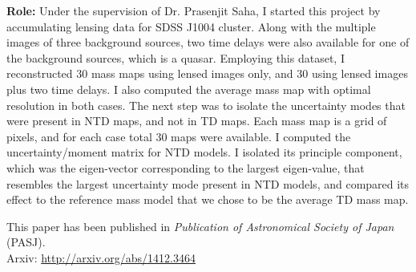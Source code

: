 {\bf Role:} Under the supervision of Dr. Prasenjit Saha, I started this project
by accumulating lensing data for SDSS J1004 cluster. Along with the multiple
images of three background sources, two time delays were also available for one 
of the background sources, which is a quasar. Employing this dataset, I reconstructed
30 mass maps using lensed images only, and 30 using lensed images plus two time
delays. I also computed the average mass map with optimal resolution in both
cases. The next step was to isolate the uncertainty modes that were present
in NTD maps, and not in TD maps. Each mass map is a grid of pixels, and for each
case total 30 maps were available. 
I computed the uncertainty/moment matrix for NTD models.
I isolated its principle component, which was the eigen-vector corresponding
to the largest eigen-value, that resembles the largest uncertainty
mode present in NTD models, and compared its effect to the reference 
mass model that we chose to be the average TD mass map. 

This paper has been published in {\it Publication of Astronomical Society of Japan} (PASJ). 
\\
Arxiv: \url{http://arxiv.org/abs/1412.3464}

\clearpage
